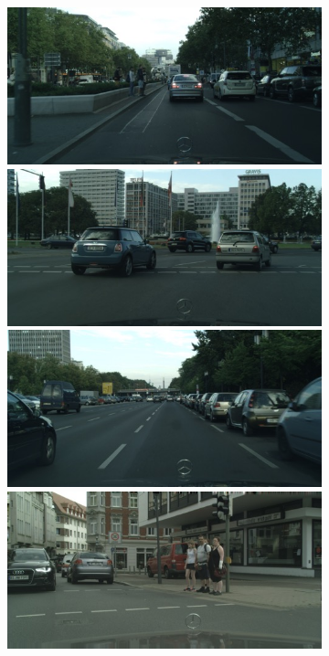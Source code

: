 {\begin{figure}[t]
{{\begin{subfigure}[t]{0.24\linewidth}
\begin{center}
		\includegraphics[width=\linewidth,trim={0px 60px 0 0px},clip]{qualitative/berlin_000036_000019_leftImg8bit.jpg}
		\includegraphics[width=\linewidth,trim={0px 60px 0 0px},clip]{qualitative/berlin_000046_000019_leftImg8bit.jpg}
		\includegraphics[width=\linewidth,trim={0px 60px 0 0px},clip]{qualitative/berlin_000049_000019_leftImg8bit.jpg}
		\includegraphics[width=\linewidth,trim={0px 60px 0 0px},clip]{qualitative/bielefeld_000000_018102_leftImg8bit.jpg}

\end{center}
\end{subfigure}}}
\end{figure}}
